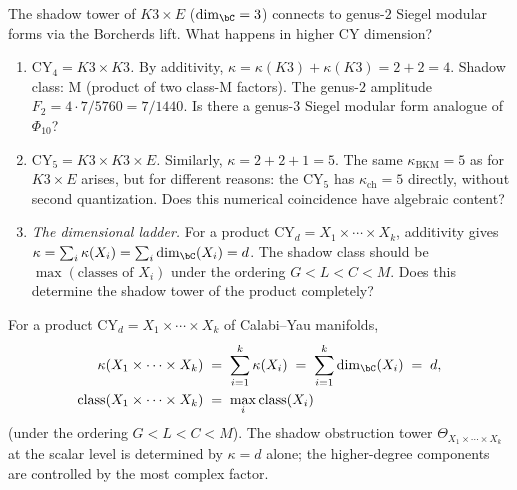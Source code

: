 \begin{openproblem}
\label{op:programme-i-higher-dim}
The shadow tower of $K3 \times E$ ($\dim_\bC = 3$) connects
to genus-$2$ Siegel modular forms via the Borcherds lift.
What happens in higher CY dimension?
\begin{enumerate}[label=\textup{(I\arabic*)}]
\item \emph{$\mathrm{CY}_4 = K3 \times K3$.} By additivity,
 $\kappa = \kappa(K3) + \kappa(K3) = 2 + 2 = 4$.
 Shadow class: M (product of two class-M factors).
 The genus-$2$ amplitude $F_2 = 4 \cdot 7/5760 = 7/1440$.
 Is there a genus-$3$ Siegel modular form analogue of
 $\Phi_{10}$?
\item \emph{$\mathrm{CY}_5 = K3 \times K3 \times E$.}
 Similarly,
 $\kappa = 2 + 2 + 1 = 5$. The same
 $\kappa_{\mathrm{BKM}} = 5$
 as for $K3 \times E$ arises, but for different reasons:
 the CY$_5$ has $\kappa_{\mathrm{ch}} = 5$ directly, without
 second quantization. Does this numerical coincidence
 have algebraic content?
\item \emph{The dimensional ladder.} For a product
 $\mathrm{CY}_d = X_1 \times \cdots \times X_k$,
 additivity gives
 $\kappa = \sum_i \kappa(X_i) = \sum_i \dim_\bC(X_i) = d$.
 The shadow class should be
 $\max(\text{classes of } X_i)$ under the ordering
 $G < L < C < M$. Does this determine the shadow
 tower of the product completely?
\end{enumerate}
\end{openproblem}

\begin{conjecture}
\label{conj:cy-product-shadow}
\ClaimStatusConjectured\quad
For a product $\mathrm{CY}_d = X_1 \times \cdots \times X_k$ of
Calabi--Yau manifolds,
\begin{align}
\kappa(X_1 \times \cdots \times X_k)
 &\;=\; \sum_{i=1}^k \kappa(X_i)
 \;=\; \sum_{i=1}^k \dim_\bC(X_i)
 \;=\; d, \\
\operatorname{class}(X_1 \times \cdots \times X_k)
 &\;=\; \max_i \operatorname{class}(X_i)
\end{align}
\textup{(}under the ordering
$G < L < C < M$\textup{)}. The shadow obstruction tower
$\Theta_{X_1 \times \cdots \times X_k}$ at the scalar
level is determined by $\kappa = d$ alone; the higher-degree
components are controlled by the most complex factor.
\end{conjecture}


